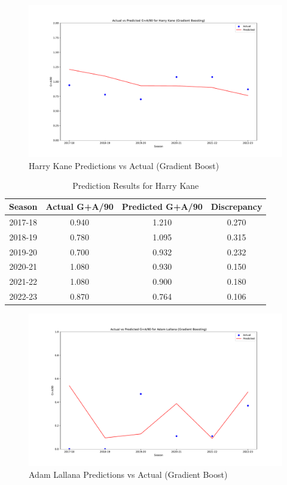 \documentclass[12pt]{article}
\begin{document}

\begin{figure}[H]
  \centering
  \includegraphics[width=1\textwidth]{GradBoost_Kane.pdf}
  \caption{Harry Kane Predictions vs Actual (Gradient Boost)}
  \label{fig:Kane_graph}
  \end{figure}


  \begin{table}[h]
    \centering
    \begin{tabular}{|c|c|c|c|}
    \hline
    \textbf{Season} & \textbf{Actual G+A/90} & \textbf{Predicted G+A/90} & \textbf{Discrepancy} \\
    \hline
    2017-18 & 0.940 & 1.210 & 0.270 \\
    2018-19 & 0.780 & 1.095 & 0.315 \\
    2019-20 & 0.700 & 0.932 & 0.232 \\
    2020-21 & 1.080 & 0.930 & 0.150 \\
    2021-22 & 1.080 & 0.900 & 0.180 \\
    2022-23 & 0.870 & 0.764 & 0.106 \\
    \hline
    \end{tabular}
    \caption{Prediction Results for Harry Kane}
    \label{tab:kane_prediction_results}
  \end{table}
  

\begin{figure}[H]
  \centering
  \includegraphics[width=1\textwidth]{GradBoost_Lallana.pdf}
  \caption{Adam Lallana Predictions vs Actual (Gradient Boost)}
  \label{fig:Lallana_graph}
  \end{figure}
\end{document}
